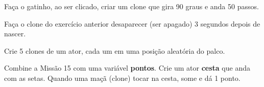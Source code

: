 \begin{exercicio}
Faça o gatinho, ao ser clicado, criar um clone que gira 90 graus e anda 50 passos.
\end{exercicio}

\begin{solucao}
\begin{pilha}
\end{pilha}
\begin{pilha}
\end{pilha}
\end{solucao}

\begin{exercicio}
Faça o clone do exercício anterior desaparecer (ser apagado) 3 segundos depois de nascer.
\end{exercicio}

\begin{solucao}
\begin{pilha}
\end{pilha}
\end{solucao}

\begin{exercicio}
Crie 5 clones de um ator, cada um em uma posição aleatória do palco.
\end{exercicio}

\begin{solucao}
\begin{pilha}
\sbcend
\end{pilha}
\end{solucao}

\begin{desafio}
Combine a Missão 15 com uma variável \textbf{pontos}. Crie um ator \textbf{cesta} que anda com as setas. Quando uma maçã (clone) tocar na cesta, some e dá 1 ponto.
\end{desafio}

